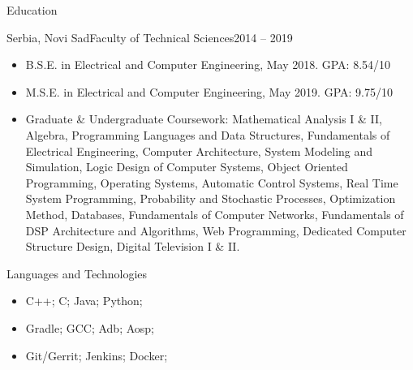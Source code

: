 \documentclass[]{mcdowellcv}
\begin{document}
	\begin{cvsection}{Education}
		\begin{cvsubsection}{Serbia, Novi Sad}{Faculty of Technical Sciences}{2014 -- 2019}
			\begin{itemize}
				\item B.S.E. in Electrical and Computer Engineering, May 2018. GPA: 8.54/10
				\item M.S.E. in Electrical and Computer Engineering, May 2019. GPA: 9.75/10
				\item Graduate \& Undergraduate Coursework: Mathematical Analysis I \& II, Algebra, Programming Languages and Data Structures,
				Fundamentals of Electrical Engineering, Computer Architecture, System Modeling and Simulation, Logic Design of Computer Systems,
				Object Oriented Programming, Operating Systems, Automatic Control Systems, Real Time System Programming, Probability and Stochastic Processes,
				Optimization Method, Databases, Fundamentals of Computer Networks, Fundamentals of DSP Architecture and Algorithms,
				Web Programming, Dedicated Computer Structure Design, Digital Television I \& II.
			\end{itemize}
		\end{cvsubsection}
	\end{cvsection}

	\begin{cvsection}{Languages and Technologies}
		\begin{cvsubsection}{}{}{}
			\begin{itemize}
				\item C++; C; Java; Python;
				\item Gradle; GCC; Adb; Aosp;
				\item Git/Gerrit; Jenkins; Docker;
			\end{itemize}
		\end{cvsubsection}
	\end{cvsection}
\end{document}
